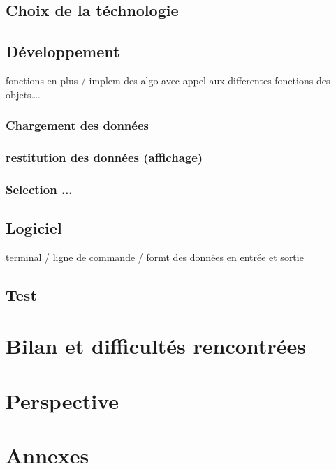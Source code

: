 \documentclass[oneside,13pt,a4paper]{report}
\begin{document}
        \section{Choix de la téchnologie}

        \section{Développement}

            fonctions en plus / implem des algo avec appel aux differentes fonctions des objets….

            \subsection{Chargement des données}

            \subsection{restitution des données (affichage)}

            \subsection{Selection ...}

        \section{Logiciel}

            terminal / ligne de commande / formt des données en entrée et sortie

        \section{Test}



    \chapter{Bilan et difficultés rencontrées}


    \chapter{Perspective}


    \chapter{Annexes}
\end{document}
